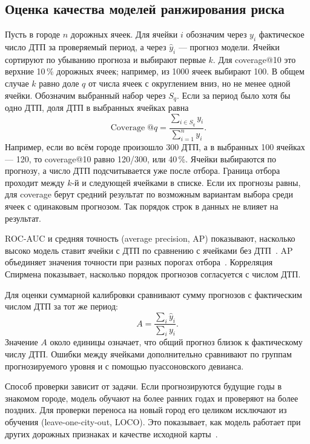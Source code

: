 \documentclass[coursework]{SCWorks}
\begin{document}
\subsection{Оценка качества моделей ранжирования риска}

Пусть в городе $n$ дорожных ячеек. Для ячейки $i$ обозначим
через $y_i$ фактическое число ДТП за проверяемый период, а через
$\widehat y_i$ --- прогноз модели. Ячейки сортируют по убыванию
прогноза и выбирают первые $k$. Для coverage@10 это верхние
10\,\% дорожных ячеек; например, из 1000 ячеек выбирают 100.
В общем случае $k$ равно доле $q$ от числа ячеек с округлением
вниз, но не менее одной ячейки. Обозначим выбранный набор через
$S_q$. Если за период было хотя бы одно ДТП, доля ДТП
в выбранных ячейках равна
\begin{equation}
  \operatorname{Coverage}@q=
  \frac{\sum_{i\in S_q}y_i}{\sum_{i=1}^{n}y_i}.
  \label{eq:coverage}
\end{equation}
Например, если во всём городе произошло 300 ДТП, а в выбранных
100 ячейках --- 120, то coverage@10 равно 120/300, или 40\,\%.
Ячейки выбираются по прогнозу, а число ДТП подсчитывается уже
после отбора. Граница отбора проходит между $k$-й и следующей
ячейками в списке. Если их прогнозы равны, для coverage берут
средний результат по возможным вариантам выбора среди ячеек
с одинаковым прогнозом. Так порядок строк в данных не влияет
на результат.

ROC-AUC и средняя точность (average precision, AP) показывают,
насколько высоко модель ставит ячейки с ДТП по сравнению с ячейками
без ДТП~\cite{saito2015}. AP объединяет значения точности при разных
порогах отбора~\cite{sklearnap}. Корреляция Спирмена показывает,
насколько порядок прогнозов согласуется с числом ДТП.

Для оценки суммарной калибровки сравнивают сумму прогнозов
с фактическим числом ДТП за тот же период:
\begin{equation}
  A=\frac{\sum_i\widehat y_i}{\sum_i y_i}.
  \label{eq:calibration}
\end{equation}
Значение $A$ около единицы означает, что общий прогноз близок
к фактическому числу ДТП. Ошибки между ячейками дополнительно
сравнивают по группам прогнозируемого уровня и с помощью
пуассоновского девианса.

Способ проверки зависит от задачи. Если прогнозируются будущие годы
в знакомом городе, модель обучают на более ранних годах и проверяют
на более поздних. Для проверки переноса на новый город его целиком
исключают из обучения (leave-one-city-out, LOCO). Это показывает,
как модель работает при других дорожных признаках и качестве
исходной карты~\cite{roberts2017}.
\end{document}
